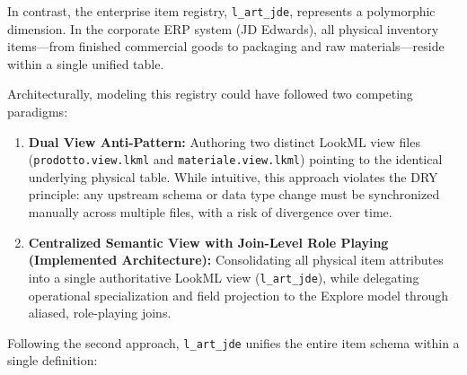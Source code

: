 In contrast, the enterprise item registry, \texttt{l\_art\_jde}, represents a polymorphic dimension. In the corporate ERP system (JD Edwards), all physical inventory items—from finished commercial goods to packaging and raw materials—reside within a single unified table. 

Architecturally, modeling this registry could have followed two competing paradigms:
\begin{enumerate}
    \item \textbf{Dual View Anti-Pattern:} Authoring two distinct LookML view files (\texttt{prodotto.view.lkml} and \texttt{materiale.view.lkml}) pointing to the identical underlying physical table. While intuitive, this approach violates the DRY principle: any upstream schema or data type change must be synchronized manually across multiple files, with a risk of divergence over time.
    \item \textbf{Centralized Semantic View with Join-Level Role Playing (Implemented Architecture):} Consolidating all physical item attributes into a single authoritative LookML view (\texttt{l\_art\_jde}), while delegating operational specialization and field projection to the Explore model through aliased, role-playing joins.
\end{enumerate}

Following the second approach, \texttt{l\_art\_jde} unifies the entire item schema within a single definition:


